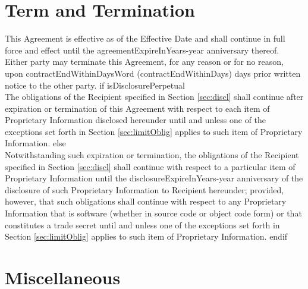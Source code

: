 \documentclass[12pt]{article}
\newcommand{\VAR}[1]{{\color{blue}#1}}
\newcommand{\BLOCK}[1]{{\smallskip \color{red}#1 \\ }}
\begin{document}
\section{Term and Termination}
This Agreement is effective as of the Effective Date and shall continue in full force and effect until the {agreementExpireInYears}-year anniversary thereof. Either party may terminate this Agreement, for any reason or for no reason, upon \VAR{contractEndWithinDaysWord} (\VAR{contractEndWithinDays}) days prior written notice to the other party.
\BLOCK{ if isDisclosurePerpetual }
    The obligations of the Recipient specified in Section \ref{sec:discl} shall continue after expiration or termination of this Agreement with respect to each item of Proprietary Information disclosed hereunder until and unless one of the exceptions set forth in Section \ref{sec:limitOblig} applies to such item of Proprietary Information.
\BLOCK{ else }
    Notwithstanding such expiration or termination, the obligations of the Recipient specified in Section \ref{sec:discl} shall continue with respect to a particular item of Proprietary Information until the \VAR{disclosureExpireInYears}-year anniversary of the disclosure of such Proprietary Information to Recipient hereunder; provided, however, that such obligations shall continue with respect to any Proprietary Information that is software (whether in source code or object code form) or that constitutes a trade secret until and unless one of the exceptions set forth in Section \ref{sec:limitOblig} applies to such item of Proprietary Information.
\BLOCK{ endif }

\section{Miscellaneous}
\end{document}
